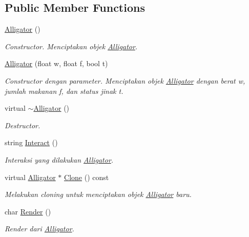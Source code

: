\subsection*{Public Member Functions}
\begin{DoxyCompactItemize}
\item 
\hyperlink{classAlligator_af1f21eea8d991b0ceb892448f456e587}{Alligator} ()
\begin{DoxyCompactList}\small\item\em Constructor. Menciptakan objek \hyperlink{classAlligator}{Alligator}. \end{DoxyCompactList}\item 
\hyperlink{classAlligator_a8adf9cbeba2884e609da9fd282edba93}{Alligator} (float w, float f, bool t)
\begin{DoxyCompactList}\small\item\em Constructor dengan parameter. Menciptakan objek \hyperlink{classAlligator}{Alligator} dengan berat w, jumlah makanan f, dan status jinak t. \end{DoxyCompactList}\item 
virtual \hyperlink{classAlligator_a9504f449fe1f01c94c0052f994340b14}{$\sim$\+Alligator} ()
\begin{DoxyCompactList}\small\item\em Destructor. \end{DoxyCompactList}\item 
string \hyperlink{classAlligator_a8f6141caa973d33f2066c3561cd817b3}{Interact} ()
\begin{DoxyCompactList}\small\item\em Interaksi yang dilakukan \hyperlink{classAlligator}{Alligator}. \end{DoxyCompactList}\item 
virtual \hyperlink{classAlligator}{Alligator} $\ast$ \hyperlink{classAlligator_aa317f0d37332919f638128c41cd7b53f}{Clone} () const 
\begin{DoxyCompactList}\small\item\em Melakukan cloning untuk menciptakan objek \hyperlink{classAlligator}{Alligator} baru. \end{DoxyCompactList}\item 
char \hyperlink{classAlligator_aa8f0a207888bf7f682ebc6b57270dd33}{Render} ()
\begin{DoxyCompactList}\small\item\em Render dari \hyperlink{classAlligator}{Alligator}. \end{DoxyCompactList}\end{DoxyCompactItemize}
